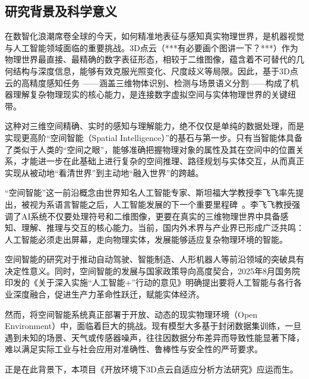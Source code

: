 \documentclass[12pt]{article}
\begin{document}
\subsection{研究背景及科学意义}

在数智化浪潮席卷全球的今天，如何精准地表征与感知真实物理世界，是机器视觉与人工智能领域面临的重要挑战。3D点云（***有必要画个图讲一下？***）作为物理世界最直接、最精确的数字表征形态，相较于二维图像，蕴含着不可替代的几何结构与深度信息，能够有效克服光照变化、尺度歧义等局限。因此，基于3D点云的高精度感知任务
——涵盖三维物体识别、检测与场景语义分割——构成了机器理解复杂物理现实的核心能力，是连接数字虚拟空间与实体物理世界的关键纽带。

这种对三维空间精确、实时的感知与理解能力，绝不仅仅是单纯的数据处理，而是实现更高阶“空间智能（Spatial Intelligence）”的基石与第一步。只有当智能体具备了类似于人类的“空间之眼”，能够准确把握物理对象的属性及其在空间中的位置关系，才能进一步在此基础上进行复杂的空间推理、路径规划与实体交互，从而真正实现从被动地“看清世界”到主动地“融入世界”的跨越。

“空间智能”这一前沿概念由世界知名人工智能专家、斯坦福大学教授李飞飞率先提出，被视为系语言智能之后，人工智能发展的下一个重要里程碑~\cite{li25spatialai}。李飞飞教授强调了AI系统不仅要处理符号和二维图像，更要在真实的三维物理世界中具备感知、理解、推理与交互的核心能力。当前，国内外术界与产业界已形成广泛共鸣：人工智能必须走出屏幕，走向物理实体，发展能够适应复杂物理环境的智能。

空间智能的研究对于推动自动驾驶、智能制造、人形机器人等前沿领域的突破具有决定性意义。同时，空间智能的发展与国家政策导向高度契合，2025年8月国务院印发的《关于深入实施“人工智能+”行动的意见》明确提出要将人工智能与各行各业深度融合，促进生产力革命性跃迁，赋能实体经济。


然而，将空间智能系统真正部署于开放、动态的现实物理环境（Open Environment）中，面临着巨大的挑战。现有模型大多基于封闭数据集训练，一旦遇到未知的场景、天气或传感器噪声，往往因数据分布差异而导致性能显著下降，难以满足实际工业与社会应用对准确性、鲁棒性与安全性的严苛要求。

正是在此背景下，本项目《开放环境下3D点云自适应分析方法研究》应运而生。
\end{document}

